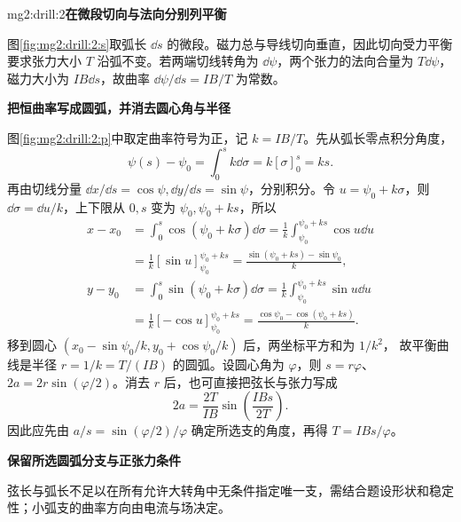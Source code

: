 \begin{drillsolution}{mg2:drill:2}\textbf{在微段切向与法向分别列平衡}\par\nobreak
图\ref{fig:mg2:drill:2:s}取弧长 $\dd s$ 的微段。磁力总与导线切向垂直，因此切向受力平衡要求张力大小 $T$ 沿弧不变。若两端切线转角为 $\dd\psi$，两个张力的法向合量为 $T\dd\psi$，磁力大小为 $IB\dd s$，故曲率 $\dd\psi/\dd s=IB/T$ 为常数。



\par\medskip{}\noindent\textbf{把恒曲率写成圆弧，并消去圆心角与半径}\par\nobreak
图\ref{fig:mg2:drill:2:p}中取定曲率符号为正，记 $k=IB/T$。先从弧长零点积分角度，
\[
 \psi(s)-\psi_0=\int_0^s k\dd\sigma=k[\sigma]_0^s=ks.
\]
再由切线分量 $\dd x/\dd s=\cos\psi,\dd y/\dd s=\sin\psi$，分别积分。令 $u=\psi_0+k\sigma$，则 $\dd\sigma=\dd u/k$，上下限从 $0,s$ 变为 $\psi_0,\psi_0+ks$，所以
\[
 \begin{aligned}
 x-x_0&=\int_0^s\cos(\psi_0+k\sigma)\dd\sigma
 =\frac1k\int_{\psi_0}^{\psi_0+ks}\cos u\dd u\\
 &=\frac1k[\sin u]_{\psi_0}^{\psi_0+ks}
 =\frac{\sin(\psi_0+ks)-\sin\psi_0}{k},\\
 y-y_0&=\int_0^s\sin(\psi_0+k\sigma)\dd\sigma
 =\frac1k\int_{\psi_0}^{\psi_0+ks}\sin u\dd u\\
 &=\frac1k[-\cos u]_{\psi_0}^{\psi_0+ks}
 =\frac{\cos\psi_0-\cos(\psi_0+ks)}{k}.
 \end{aligned}
\]
移到圆心 $(x_0-\sin\psi_0/k,y_0+\cos\psi_0/k)$ 后，两坐标平方和为 $1/k^2$，
故平衡曲线是半径 $r=1/k=T/(IB)$ 的圆弧。设圆心角为 $\varphi$，则 $s=r\varphi$、$2a=2r\sin(\varphi/2)$。消去 $r$ 后，也可直接把弦长与张力写成\[\boxed{2a=\frac{2T}{IB}\sin\!\left(\frac{IBs}{2T}\right)}.\]因此应先由 $a/s=\sin(\varphi/2)/\varphi$ 确定所选支的角度，再得 $T=IBs/\varphi$。

\par\medskip{}\noindent\textbf{保留所选圆弧分支与正张力条件}\par\nobreak
弦长与弧长不足以在所有允许大转角中无条件指定唯一支，需结合题设形状和稳定性；小弧支的曲率方向由电流与场决定。\end{drillsolution}

